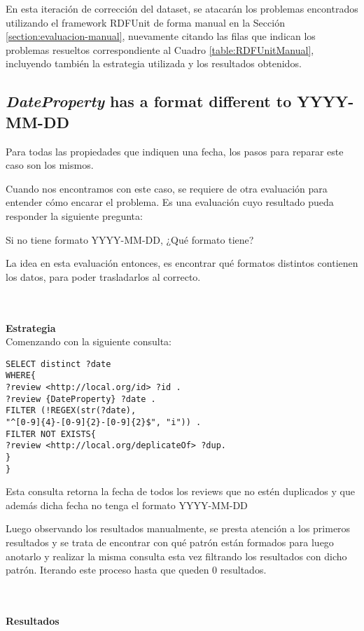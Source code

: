\noindent En esta iteración de corrección del dataset, se atacarán los problemas encontrados utilizando el framework RDFUnit de forma manual 
en la Sección \ref{section:evaluacion-manual}, nuevamente citando las filas que indican los problemas resueltos correspondiente al
Cuadro \ref{table:RDFUnitManual}, incluyendo también la estrategia utilizada y los resultados obtenidos.

\subsection*{\textit{DateProperty} has a format different to YYYY-MM-DD}
Para todas las propiedades que indiquen una fecha, los pasos para reparar este caso son los mismos.

Cuando nos encontramos con este caso, se requiere de otra evaluación para entender cómo encarar el problema. Es una evaluación cuyo resultado
pueda responder la siguiente pregunta:

Si no tiene formato YYYY-MM-DD, ¿Qué formato tiene?

La idea en esta evaluación entonces, es encontrar qué formatos distintos contienen los datos, para poder trasladarlos al correcto.

~\\\\ 
\textbf{Estrategia}\\
Comenzando con la siguiente consulta:

\newpage
\begin{lstlisting}[frame=single]  
SELECT distinct ?date 
WHERE{
?review <http://local.org/id> ?id .
?review {DateProperty} ?date .
FILTER (!REGEX(str(?date), 
"^[0-9]{4}-[0-9]{2}-[0-9]{2}$", "i")) .
FILTER NOT EXISTS{
?review <http://local.org/deplicateOf> ?dup.
}
}
\end{lstlisting}



Esta consulta retorna la fecha de todos los reviews que no estén duplicados y que además dicha fecha no tenga el formato YYYY-MM-DD

Luego observando los resultados manualmente, se presta atención a los primeros resultados y se trata de encontrar con qué patrón están formados 
para luego anotarlo y realizar la misma consulta esta vez filtrando los resultados con dicho patrón. Iterando este proceso hasta que 
queden 0 resultados.

~\\\\\textbf{Resultados}\\

